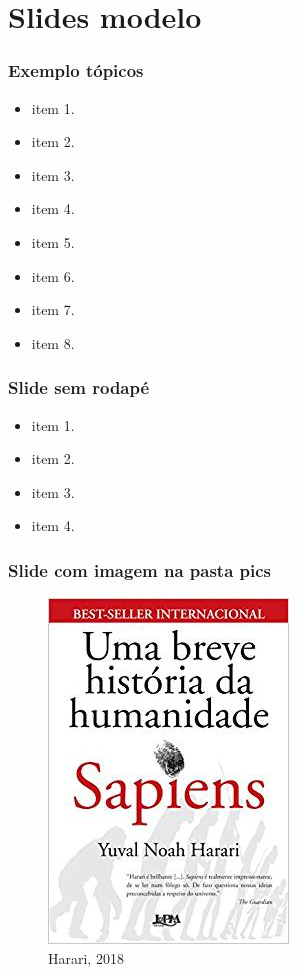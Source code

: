 \documentclass[handout,serif, professionalfont, usenames, dvipsnames, aspectratio = 169]{beamer}\usepackage[]{graphicx}\usepackage[]{color}
\begin{document}

\section{Slides modelo}


\begin{frame}
  \frametitle{Exemplo tópicos}
  \begin{itemize}
    \itemsep 2ex
  \item item 1. 
  \item item 2. 
  \item item 3. 
  \item item 4. 
  \item item 5. 
  \item item 6. 
  \item item 7. 
  \item item 8. 
  \end{itemize}
\end{frame}


\begin{frame}[plain]
  \frametitle{Slide sem rodapé}

\begin{itemize}
\item item 1.
\item item 2.
\item item 3.
\item item 4.
\end{itemize}

\end{frame}


\begin{frame}
  \frametitle{Slide com imagem na pasta pics}

\begin{figure}
    \centering
    \includegraphics[width=.3\linewidth]{./pics/sapiens.jpeg}
    \caption{Harari, 2018}
\nocite{harari}
\end{figure}

\end{frame}
\end{document}
